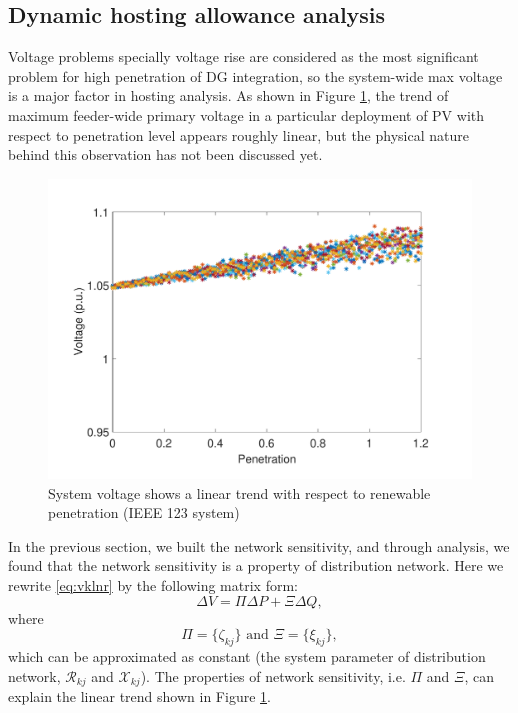 \documentclass{article}
\begin{document}
\subsection{Dynamic hosting allowance analysis}
Voltage problems specially voltage rise are considered as the most significant problem for high penetration of DG integration\cite{walla2012determining}, so the system-wide max voltage is a major factor in hosting analysis. 
As shown in Figure \ref{fig:trend}, the trend of maximum feeder-wide primary voltage in a particular deployment of PV with respect to penetration level appears roughly linear\cite{rylander2015streamlined}, but the physical nature behind this observation has not been discussed yet. 
\begin{figure}[h!]
    \centering
    \includegraphics[width=0.9\linewidth]{pics/trend-3.pdf}
    \caption{System voltage shows a linear trend with respect to renewable penetration (IEEE 123 system)}
    \label{fig:trend}
\end{figure}
In the previous section, we built the network sensitivity, and through analysis, we found that the network sensitivity is a property of distribution network. Here we rewrite \eqref{eq:vklnr} by the following matrix form:
\begin{equation}
  \Delta V = \Pi \Delta P + \Xi \Delta Q, \label{eq:lZX}  
\end{equation}
where
\begin{equation}
  \Pi = \{\zeta_{kj}\}  \text{ and } \Xi = \{\xi_{kj}\}, \label{eq:ZX}  
\end{equation}
which can be approximated as constant (the system parameter of distribution network, $\mathcal{R}_{kj}$ and $\mathcal{X}_{kj}$). The properties of network sensitivity, i.e. $\Pi$ and $\Xi$, can explain the linear trend shown in Figure \ref{fig:trend}.
\end{document}

